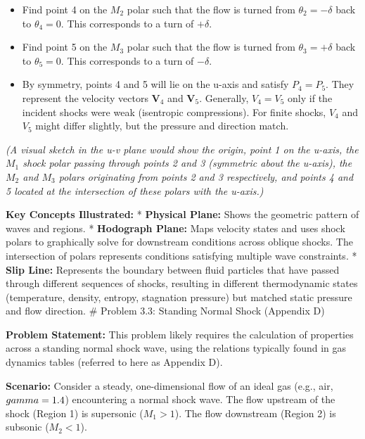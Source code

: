 \begin{itemize}
  \begin{itemize}
  \tightlist
  \item
    Find point 4 on the \(M_2\) polar such that the flow is turned from
    \(\theta_2 = -\delta\) back to \(\theta_4 = 0\). This corresponds to
    a turn of \(+\delta\).
  \item
    Find point 5 on the \(M_3\) polar such that the flow is turned from
    \(\theta_3 = +\delta\) back to \(\theta_5 = 0\). This corresponds to
    a turn of \(-\delta\).
  \item
    By symmetry, points 4 and 5 will lie on the u-axis and satisfy
    \(P_4=P_5\). They represent the velocity vectors \(\mathbf{V}_4\)
    and \(\mathbf{V}_5\). Generally, \(V_4 = V_5\) only if the incident
    shocks were weak (isentropic compressions). For finite shocks,
    \(V_4\) and \(V_5\) might differ slightly, but the pressure and
    direction match.
  \end{itemize}
\end{itemize}

\emph{(A visual sketch in the u-v plane would show the origin, point 1
on the u-axis, the \(M_1\) shock polar passing through points 2 and 3
(symmetric about the u-axis), the \(M_2\) and \(M_3\) polars originating
from points 2 and 3 respectively, and points 4 and 5 located at the
intersection of these polars with the u-axis.)}

\textbf{Key Concepts Illustrated:} * \textbf{Physical Plane:} Shows the
geometric pattern of waves and regions. * \textbf{Hodograph Plane:} Maps
velocity states and uses shock polars to graphically solve for
downstream conditions across oblique shocks. The intersection of polars
represents conditions satisfying multiple wave constraints. *
\textbf{Slip Line:} Represents the boundary between fluid particles that
have passed through different sequences of shocks, resulting in
different thermodynamic states (temperature, density, entropy,
stagnation pressure) but matched static pressure and flow direction. \#
Problem 3.3: Standing Normal Shock (Appendix D)

\textbf{Problem Statement:} This problem likely requires the calculation
of properties across a standing normal shock wave, using the relations
typically found in gas dynamics tables (referred to here as Appendix D).

\textbf{Scenario:} Consider a steady, one-dimensional flow of an ideal
gas (e.g., air, \(\\gamma = 1.4\)) encountering a normal shock wave. The
flow upstream of the shock (Region 1) is supersonic (\(M_1 > 1\)). The
flow downstream (Region 2) is subsonic (\(M_2 < 1\)).

